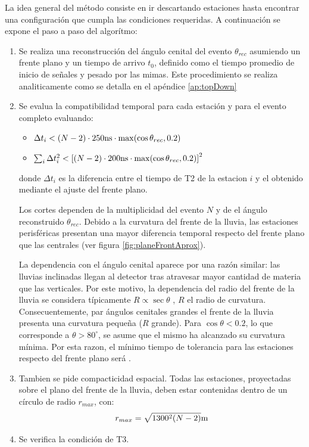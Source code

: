 	La idea general del método consiste en ir descartando estaciones hasta encontrar una configuración que cumpla las condiciones requeridas.
	A continuación se expone el paso a paso del algorítmo:
	\begin{enumerate}
	 \item Se realiza una reconstrucción del ángulo cenital del evento $\theta_{rec}$ asumiendo un frente plano y un tiempo de arrivo $t_0$, definido como el tiempo promedio de inicio de señales y pesado por las mimas. Este procedimiento se realiza analiticamente como se detalla en el apéndice \ref{ap:topDown}
	 \item Se evalua la compatibilidad temporal para cada estación y para el evento completo evaluando:
	 \begin{itemize}
	  \item $\Delta t_i < (N-2)\cdot 250{\rm ns} \cdot {\rm max}(\cos\theta_{rec},0.2)$
	  \item $\sum_i\Delta t_i^2 < \left[(N-2)\cdot 200{\rm ns} \cdot {\rm max}(\cos\theta_{rec},0.2)\right]^2$
	 \end{itemize}
	 donde $\Delta t_i$ es la diferencia entre el tiempo de T2 de la estacion $i$ y el obtenido mediante el ajuste del frente plano.
	 
	 Los cortes dependen de la multiplicidad del evento $N$ y de el ángulo reconstruido $\theta_{rec}$.
	 Debido a la curvatura del frente de la lluvia, las estaciones perisféricas presentan una mayor diferencia temporal respecto del frente plano que las centrales (ver figura \ref{fig:planeFrontAprox}). 
	 
	 La dependencia con el ángulo cenital aparece por una razón similar: las lluvias inclinadas llegan al detector tras atravesar mayor cantidad de materia que las verticales. Por este motivo, la dependencia del radio del frente de la lluvia se considera típicamente $R\propto\sec\theta$ \cite{cite:ShowerFront}, $R$ el radio de curvatura.
	 Consecuentemente, par ángulos cenitales grandes el frente de la lluvia presenta una curvatura pequeña ($R$ grande).
	 Para $\cos\theta < 0.2$, lo que corresponde a $\theta>80^\circ$, se asume que el mismo ha alcanzado su curvatura mínima.
	 Por esta razon, el mínimo tiempo de tolerancia para las estaciones respecto del frente plano será .
	 \item Tambien se pide compacticidad espacial.
	 Todas las estaciones, proyectadas sobre el plano del frente de la lluvia, deben estar contenidas dentro de un círculo de radio $r_{max}$, con:
	 \begin{equation}
	  r_{max} = \sqrt{1300^2(N-2)}{\rm m}
	 \end{equation}
	 \item Se verifica la condición de T3.
	\end{enumerate}
